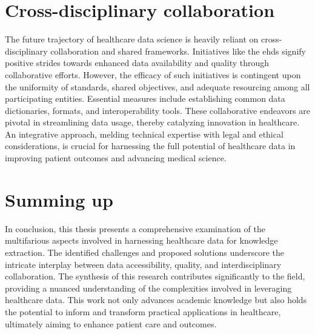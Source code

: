 \section{Cross-disciplinary collaboration}
The future trajectory of healthcare data science is heavily reliant on cross-disciplinary collaboration and shared frameworks. Initiatives like the \ac{ehds} signify positive strides towards enhanced data availability and quality through collaborative efforts. However, the efficacy of such initiatives is contingent upon the uniformity of standards, shared objectives, and adequate resourcing among all participating entities. Essential measures include establishing common data dictionaries, formats, and interoperability tools. These collaborative endeavors are pivotal in streamlining data usage, thereby catalyzing innovation in healthcare. An integrative approach, melding technical expertise with legal and ethical considerations, is crucial for harnessing the full potential of healthcare data in improving patient outcomes and advancing medical science.


\section{Summing up}

In conclusion, this thesis presents a comprehensive examination of the multifarious aspects involved in harnessing healthcare data for knowledge extraction. The identified challenges and proposed solutions underscore the intricate interplay between data accessibility, quality, and interdisciplinary collaboration. The synthesis of this research contributes significantly to the field, providing a nuanced understanding of the complexities involved in leveraging healthcare data. This work not only advances academic knowledge but also holds the potential to inform and transform practical applications in healthcare, ultimately aiming to enhance patient care and outcomes.




